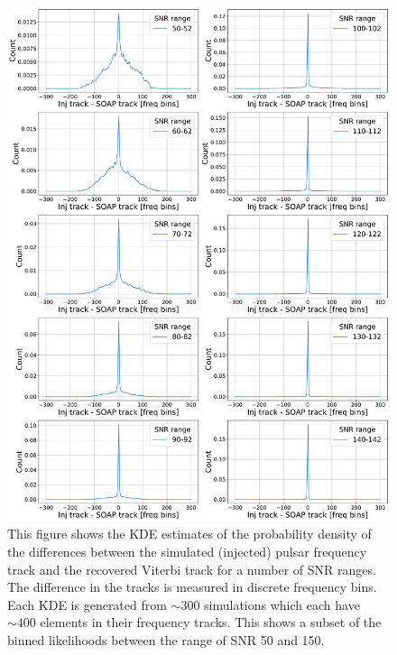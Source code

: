 \begin{figure}[hpt]

    \centering
    \includegraphics[width=\linewidth]{C5_parameter/KDE_range_50_100.pdf}
    \caption[KDE of likelihood in different \gls{SNR} ranges]{This figure shows the \gls{KDE} estimates of the probability density of the differences between the simulated (injected) pulsar frequency track and the recovered Viterbi track for a number of \gls{SNR} ranges. The difference in the tracks is measured in discrete frequency bins. Each \gls{KDE} is generated from $\sim 300$ simulations which each have $\sim 400$ elements in their frequency tracks. This shows a subset of the binned likelihoods between the range of \gls{SNR} 50 and 150.}
    \label{par_est:bayes:likelihood:kde142}
    
    \end{figure}
%

